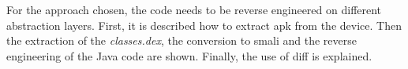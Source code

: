 For the approach chosen, the code needs to be reverse engineered on different abstraction layers.
First, it is described how to extract \gls{apk} from the device.
Then the extraction of the \textit{classes.dex}, the conversion to smali and the reverse engineering of the Java code are shown.
Finally, the use of diff is explained.
